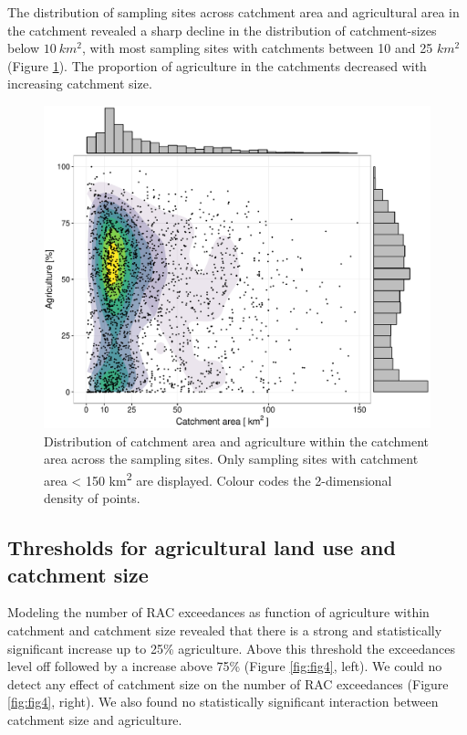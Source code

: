 \documentclass[journal=esthag,manuscript=article]{achemso}
\begin{document}
The distribution of sampling sites across catchment area and agricultural area in the catchment revealed a sharp decline in the distribution of catchment-sizes below $10~km^2$, with most sampling sites with catchments between 10 and 25 $km^2$ (Figure \ref{fig:fig3}).
The proportion of agriculture in the catchments decreased with increasing catchment size.

\begin{figure}[ht]
  \includegraphics[width=.8\textwidth]{figure3.pdf}
  \caption{Distribution of catchment area and agriculture within the catchment area across the sampling sites.
  Only sampling sites with catchment area < 150 km\textsuperscript{2} are displayed. 
  Colour codes the 2-dimensional density of points.}
  \label{fig:fig3}
\end{figure}


\subsection{Thresholds for agricultural land use and catchment size}
Modeling the number of RAC exceedances as function of agriculture within catchment and catchment size revealed that there is a strong and statistically significant increase up to 25\% agriculture.
Above this threshold the exceedances level off followed by a increase above 75\% (Figure \ref{fig:fig4}, left).
We could no detect any effect of catchment size on the number of RAC exceedances (Figure \ref{fig:fig4}, right).
We also found no statistically significant interaction between catchment size and agriculture.
\end{document}
